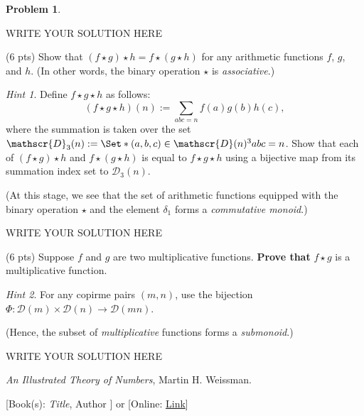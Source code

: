 \documentclass[11pt]{article}
\theoremstyle{plain}
\theoremstyle{definition}
\newtheorem{problem}{Problem}
\theoremstyle{remark}
\newtheorem*{hint}{Hint}
\numberwithin{equation}{problem}
\providecommand\given{}
\begin{document}
\begin{problem}
\begin{listinprob}
\begin{solution} %
WRITE YOUR SOLUTION HERE
\end{solution}\clearpage %

		\item (6 pts) Show that $(f\star g)\star h = f\star (g\star h)$ for any arithmetic functions $f$, $g$, and $h$. (In other words, the binary operation $\star$ is \emph{associative}.)
		\begin{hint}
			Define $f\star g\star h$ as follows:
			\[
				(f\star g\star h)(n):=\sum_{abc=n}f(a)g(b)h(c),
			\]
			where the summation is taken over the set $\mathscr{D}_{3}(n):=\Set*{ (a,b,c)\in\mathscr{D}(n)^3 \given abc=n }$. 
			Show that each of $(f\star g)\star h$ and $f\star (g\star h)$ is equal to $f\star g\star h$ using a bijective map from its summation index set to $\mathscr{D}_{3}(n)$. 
		\end{hint}
		(At this stage, we see that the set of arithmetic functions equipped with the binary operation $\star$ and the element $\delta_{1}$ forms a \emph{commutative monoid}.)
		
\begin{solution} %
WRITE YOUR SOLUTION HERE
\end{solution}\clearpage %

		\item (6 pts) Suppose $f$ and $g$ are two multiplicative functions. \textbf{Prove that} $f \star g$ is a multiplicative function.
		\begin{hint}
			For any copirme pairs $(m,n)$, use the bijection 
			$\Phi\colon \mathscr{D}(m)\times\mathscr{D}(n) \rightarrow \mathscr{D}(mn)$.
		\end{hint}
		(Hence, the subset of \emph{multiplicative} functions forms a \emph{submonoid}.)
	\end{listinprob}
\end{problem}
		
\begin{solution} %
WRITE YOUR SOLUTION HERE
\end{solution}\clearpage %



\begin{thebibliography}{9}  %
\emph{An Illustrated Theory of Numbers}, Martin H. Weissman.

[Book(s): \emph{Title}, Author ] or [Online: \href{http://example.com/}{Link}]
\end{thebibliography}  %
\end{document}

